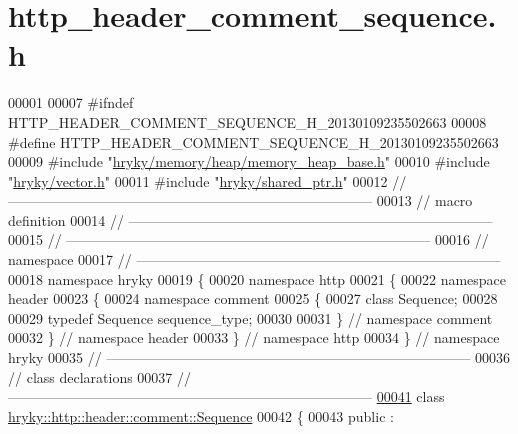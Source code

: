 \hypertarget{http__header__comment__sequence_8h_source}{\section{http\-\_\-header\-\_\-comment\-\_\-sequence.\-h}
}

\begin{DoxyCode}
00001 
00007 \textcolor{preprocessor}{#ifndef HTTP\_HEADER\_COMMENT\_SEQUENCE\_H\_20130109235502663}
00008 \textcolor{preprocessor}{}\textcolor{preprocessor}{#define HTTP\_HEADER\_COMMENT\_SEQUENCE\_H\_20130109235502663}
00009 \textcolor{preprocessor}{}\textcolor{preprocessor}{#include "\hyperlink{memory__heap__base_8h}{hryky/memory/heap/memory_heap_base.h}"}
00010 \textcolor{preprocessor}{#include "\hyperlink{vector_8h}{hryky/vector.h}"}
00011 \textcolor{preprocessor}{#include "\hyperlink{shared__ptr_8h}{hryky/shared_ptr.h}"}
00012 \textcolor{comment}{//
      ------------------------------------------------------------------------------}
00013 \textcolor{comment}{// macro definition}
00014 \textcolor{comment}{//
      ------------------------------------------------------------------------------}
00015 \textcolor{comment}{//
      ------------------------------------------------------------------------------}
00016 \textcolor{comment}{// namespace}
00017 \textcolor{comment}{//
      ------------------------------------------------------------------------------}
00018 \textcolor{keyword}{namespace }hryky
00019 \{
00020 \textcolor{keyword}{namespace }http
00021 \{
00022 \textcolor{keyword}{namespace }header
00023 \{
00024 \textcolor{keyword}{namespace }comment
00025 \{
00027     \textcolor{keyword}{class }Sequence;
00028 
00029     \textcolor{keyword}{typedef} Sequence sequence\_type;
00030 
00031 \} \textcolor{comment}{// namespace comment}
00032 \} \textcolor{comment}{// namespace header}
00033 \} \textcolor{comment}{// namespace http}
00034 \} \textcolor{comment}{// namespace hryky}
00035 \textcolor{comment}{//
      ------------------------------------------------------------------------------}
00036 \textcolor{comment}{// class declarations}
00037 \textcolor{comment}{//
      ------------------------------------------------------------------------------}
\hypertarget{http__header__comment__sequence_8h_source_l00041}{}\hyperlink{classhryky_1_1http_1_1header_1_1comment_1_1_sequence}{00041} \textcolor{comment}{}\textcolor{keyword}{class }\hyperlink{classhryky_1_1http_1_1header_1_1comment_1_1_sequence}{hryky::http::header::comment::Sequence}
00042 \{
00043 \textcolor{keyword}{public} :

\end{DoxyCode}
